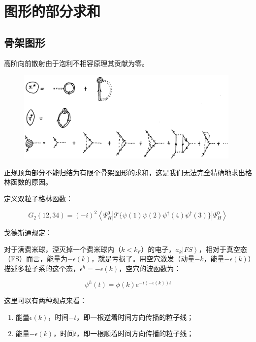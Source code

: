 \section{图形的部分求和}

\subsection{骨架图形}

高阶向前散射由于泡利不相容原理其贡献为零。

\begin{figure}[htbp]
\begin{center}
\includegraphics[width=11cm]{ManyF/skelepton.png}
\end{center}
\end{figure}

正规顶角部分不能归结为有限个骨架图形的求和，这是我们无法完全精确地求出格林函数的原因。

定义双粒子格林函数：

\begin{equation}
G_2(12,34) = (-i)^2 \left\langle \Psi_H^0 \right| \mathcal{T} \{ \psi(1) \psi(2) \psi^\dagger (4) \psi^\dagger (3)  \} \left| \Psi_H^0  \right\rangle
\end{equation}

戈德斯通规定：

对于满费米球，湮灭掉一个费米球内（$k < k_F $）的电子，$a_k \left| FS \right\rangle$，相对于真空态（FS）而言，能量为$- \epsilon(k)$，就是亏损了。用空穴激发（动量$-k$，能量$- \epsilon(k)$）描述多粒子系的这个态，$\epsilon^h = - \epsilon(k)$，空穴的波函数为：

\begin{equation}
\psi^h (t) = \phi(k) e^{-i (- \epsilon(k) ) t}
\end{equation}

这里可以有两种观点来看：

\begin{enumerate}
\item 

能量$\epsilon(k)$，时间$-t$，即一根逆着时间方向传播的粒子线；

\item

能量$- \epsilon(k)$，时间$t$，即一根顺着时间方向传播的粒子线；

\end{enumerate}

